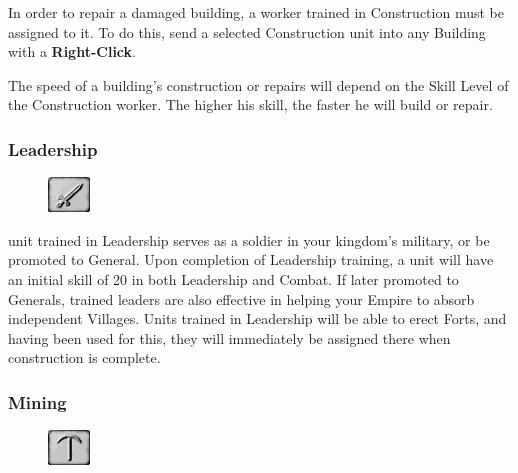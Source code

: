 In order to repair a damaged building, a worker trained in Construction must be assigned to it. To do this, send a selected Construction unit into any Building with a \textbf{Right-Click}.

The speed of a building’s construction or repairs will depend on the Skill Level of the Construction worker. The higher his skill, the faster he will build or repair.

\subsubsection{\textsf{Leadership}}


\begin{figure}
    \vspace{-20pt}
    \begin{center}
        \includegraphics[width=0.1\textwidth]{Tleadership}
    \end{center}
    \vspace{-20pt}
\end{figure}


 unit trained in Leadership serves as a soldier in your kingdom’s military, or be promoted to General. Upon completion of Leadership training, a unit will have an initial skill of 20 in both Leadership and Combat. If later promoted to Generals, trained leaders are also effective in helping your Empire to absorb independent Villages. Units trained in Leadership will be able to erect Forts, and having been used for this, they will immediately be assigned there when construction is complete.

\subsubsection{\textsf{Mining}}


\begin{figure}
    \vspace{-20pt}
    \begin{center}
        \includegraphics[width=0.1\textwidth]{Tmining}
    \end{center}
    \vspace{-20pt}
\end{figure}

